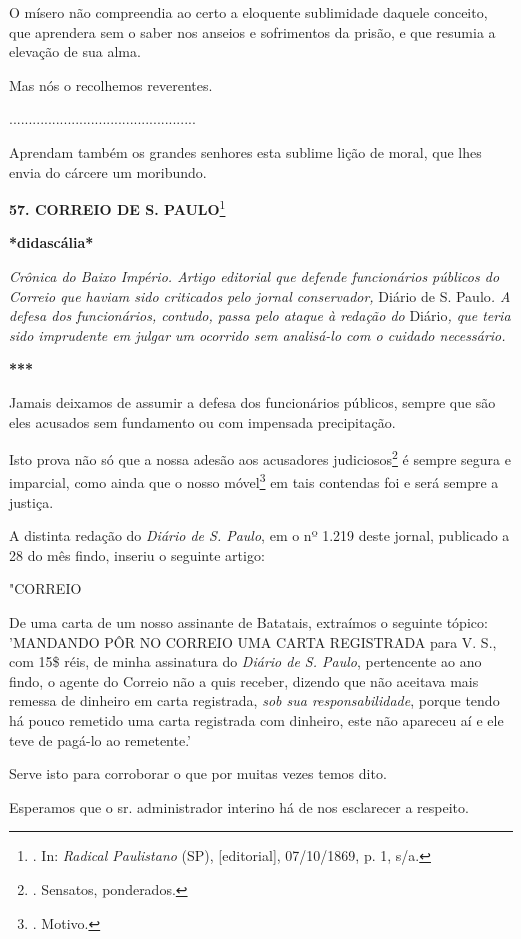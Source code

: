 O mísero não compreendia ao certo a eloquente sublimidade daquele
conceito, que aprendera sem o saber nos anseios e sofrimentos da prisão,
e que resumia a elevação de sua alma.

Mas nós o recolhemos reverentes.

................................................

Aprendam também os grandes senhores esta sublime lição de moral, que
lhes envia do cárcere um moribundo.

\textbf{57. CORREIO DE S. PAULO}\footnote{. In: \emph{Radical
  Paulistano} (SP), {[}editorial{]}, 07/10/1869, p. 1, s/a.}

\textbf{*didascália*}

\emph{Crônica do Baixo Império. Artigo editorial que defende
funcionários públicos do Correio que haviam sido criticados pelo jornal
conservador,} Diário de S. Paulo\emph{. A defesa dos funcionários,
contudo, passa pelo ataque à redação do} Diário\emph{, que teria sido
imprudente em julgar um ocorrido sem analisá-lo com o cuidado
necessário.}

\textbf{***}

Jamais deixamos de assumir a defesa dos funcionários públicos, sempre
que são eles acusados sem fundamento ou com impensada precipitação.

Isto prova não só que a nossa adesão aos acusadores
judiciosos\footnote{. Sensatos, ponderados.} é sempre segura e
imparcial, como ainda que o nosso móvel\footnote{. Motivo.} em tais
contendas foi e será sempre a justiça.

A distinta redação do \emph{Diário de S. Paulo}, em o nº 1.219 deste
jornal, publicado a 28 do mês findo, inseriu o seguinte artigo:

"CORREIO

De uma carta de um nosso assinante de Batatais, extraímos o seguinte
tópico: 'MANDANDO PÔR NO CORREIO UMA CARTA REGISTRADA para V. S., com
15\$ réis, de minha assinatura do \emph{Diário de S. Paulo}, pertencente
ao ano findo, o agente do Correio não a quis receber, dizendo que não
aceitava mais remessa de dinheiro em carta registrada, \emph{sob sua
responsabilidade}, porque tendo há pouco remetido uma carta registrada
com dinheiro, este não apareceu aí e ele teve de pagá-lo ao remetente.'

Serve isto para corroborar o que por muitas vezes temos dito.

Esperamos que o sr. administrador interino há de nos esclarecer a
respeito.

